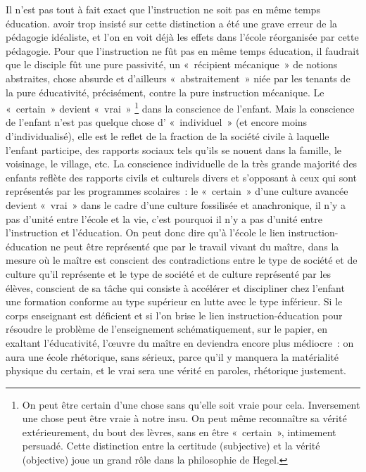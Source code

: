 \documentclass[french,twoside]{book} %
\begin{document}
Il n’est pas tout à fait exact que l’instruction ne soit pas en même temps éducation. avoir trop insisté sur cette distinction a été une grave erreur de la pédagogie idéaliste, et l’on en voit déjà les effets dans l’école réorganisée par cette pédagogie. Pour que l’instruction ne fût pas en même temps éducation, il faudrait que le disciple fût une pure passivité, un « récipient mécanique » de notions abstraites, chose absurde et d’ailleurs « abstraitement » niée par les tenants de la pure éducativité, précisément, contre la pure instruction mécanique. Le « certain » devient « vrai » \footnote{On peut être certain d’une chose sans qu’elle soit vraie pour cela. Inversement une chose peut être vraie à notre insu. On peut même reconnaître sa vérité extérieurement, du bout des lèvres, sans en être « certain », intimement persuadé. Cette distinction entre la certitude (subjective) et la vérité (objective) joue un grand rôle dans la philosophie de Hegel.} dans la conscience de l’enfant. Mais la conscience de l’enfant n’est pas quelque chose d’ « individuel » (et encore moins d’individualisé), elle est le reflet de la fraction de la société civile à laquelle l’enfant participe, des rapports sociaux tels qu’ils se nouent dans la famille, le voisinage, le village, etc. La conscience individuelle de la très grande majorité des enfants reflète des rapports civils et culturels divers et s’opposant à ceux qui sont représentés par les programmes scolaires : le « certain » d’une culture avancée devient « vrai » dans le cadre d’une culture fossilisée et anachronique, il n’y a pas d’unité entre l’école et la vie, c’est pourquoi il n’y a pas d’unité entre l’instruction et l’éducation. On peut donc dire qu’à l’école le lien instruction-éducation ne peut être représenté que par le travail vivant du maître, dans la mesure où le maître est conscient des contradictions entre le type de société et de culture qu’il représente et le type de société et de culture représenté par les élèves, conscient de sa tâche qui consiste à accélérer et discipliner chez l’enfant une formation conforme au type supérieur en lutte avec le type inférieur. Si le corps enseignant est déficient et si l’on brise le lien instruction-éducation pour résoudre le problème de l’enseignement schématiquement, sur le papier, en exaltant l’éducativité, l’œuvre du maître en deviendra encore plus médiocre : on aura une école rhétorique, sans sérieux, parce qu’il y manquera la matérialité physique du certain, et le vrai sera une vérité en paroles, rhétorique justement.\par
\end{document}
